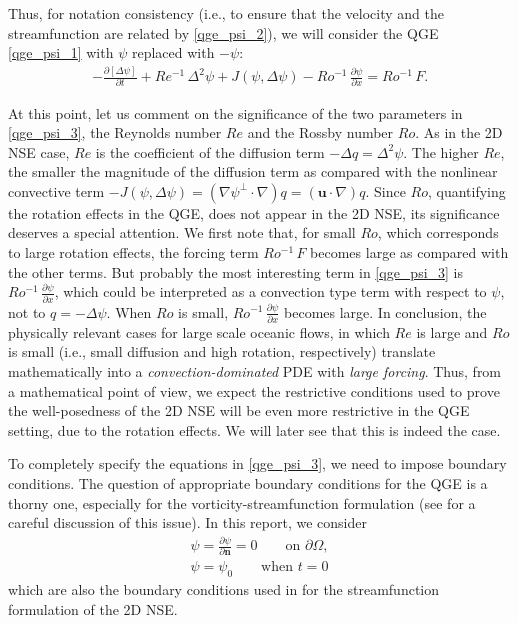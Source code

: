 Thus, for notation consistency (i.e., to ensure that the velocity and the streamfunction are related
by \eqref{qge_psi_2}), we will consider the QGE \eqref{qge_psi_1} with $\psi$ replaced with $-\psi$:
\begin{align}
  -\frac{\partial \left[ \Delta \psi \right]}{\partial t} + Re^{-1} \, \Delta^2 \psi + J(\psi , \Delta \psi)
    - Ro^{-1} \, \frac{\partial \psi}{\partial x} = Ro^{-1} \, F .  \label{qge_psi_3}
\end{align}

At this point, let us comment on the significance of the two parameters in \eqref{qge_psi_3}, the
Reynolds number $Re$ and the Rossby number $Ro$.  As in the 2D NSE case, $Re$ is the coefficient of
the diffusion term $- \Delta q = \Delta^2 \psi$.  The higher $Re$, the smaller the magnitude of the
diffusion term as compared with the nonlinear convective term $- J(\psi, \Delta \psi) = ( \nabla
\psi^{\perp} \cdot \nabla ) q = (\mathbf{u} \cdot \nabla ) q$.  Since $Ro$, quantifying the rotation
effects in the QGE, does not appear in the 2D NSE, its significance deserves a special attention.
We first note that, for small $Ro$, which corresponds to large rotation effects, the forcing term
$Ro^{-1} \, F$ becomes large as compared with the other terms.  But probably the most interesting
term in \eqref{qge_psi_3} is $\displaystyle Ro^{-1} \, \frac{\partial \psi}{\partial x}$, which
could be interpreted as a convection type term with respect to $\psi$, not to $q = -\Delta \psi$.
When $Ro$ is small, $\displaystyle Ro^{-1} \, \frac{\partial \psi}{\partial x}$ becomes large.  In
conclusion, the physically relevant cases for large scale oceanic flows, in which $Re$ is large and
$Ro$ is small (i.e., small diffusion and high rotation, respectively) translate mathematically into
a \emph{convection-dominated} PDE with \emph{large forcing}.  Thus, from a mathematical point of
view, we expect the restrictive conditions used to prove the well-posedness of the 2D NSE
\cite{Girault79,Girault86,Gunzburger89} will be even more restrictive in the QGE setting, due to the
rotation effects.  We will later see that this is indeed the case.

To completely specify the equations in \eqref{qge_psi_3}, we need to impose boundary conditions.
The question of appropriate boundary conditions for the QGE is a thorny one, especially for the
vorticity-streamfunction formulation (see \cite{Vallis06,Cummins} for a careful discussion of this
issue).  In this report, we consider 
\begin{equation}
  \begin{split}
    \psi = \frac{\partial \psi}{\partial \mathbf{n}} = 0 \qquad \text{on } \partial \Omega, \\
    \psi = \psi_0 \qquad \text{when } t = 0 
  \end{split}
\label{qge_psi_4}
\end{equation}
which are also the boundary conditions used in \cite{Gunzburger89} for the streamfunction
formulation of the 2D NSE.

